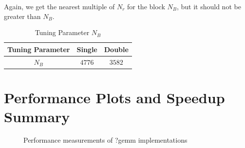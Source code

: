 Again, we get the nearest multiple of $N_r$ for the block $N_B$, but it should not be
greater than $N_B$.

\begin{table}[ht]
    \centering
    \caption{Tuning Parameter $N_B$}
    \begin{tabular}{|c|c|c|}
        \hline
        \textbf{Tuning Parameter} & \textbf{Single} & \textbf{Double}\\
        \hline
        $N_B$   & $4776$ & $3582$ \\
        \hline
    \end{tabular}
\end{table}

\clearpage

\section{Performance Plots and Speedup Summary}

\begin{figure}[htb]
    \centering
    \caption*{Performance measurements of ?gemm implementations}
    \label{fig:mtm_col_Sgflop220}
    \qquad
    \label{fig:mtm_col_Dgflop220}
\end{figure}

